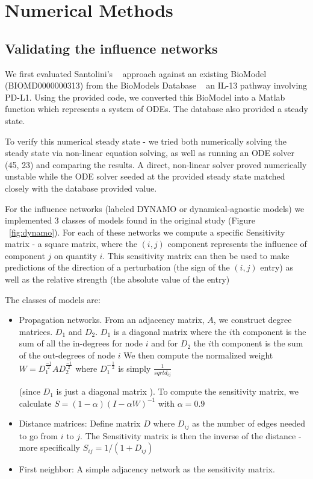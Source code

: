 \documentclass{article}
\begin{document}
\section{Numerical Methods} \label{Numerical_methods}
\subsection{Validating the influence networks}
We first evaluated Santolini's ~\cite{SantoliniE6375} approach against an existing BioModel  (BIOMD0000000313) from the BioModels Database  ~\cite{BioModels2010, PMID:21127196} an IL-13 pathway involving PD-L1. Using the provided code, we converted this BioModel into a Matlab function which represents a system of ODEs. The database also provided a steady state. 

To verify this numerical steady state - we tried both numerically solving the steady state via non-linear equation solving, as well as running an ODE solver (45, 23) and comparing the results. A direct, non-linear solver proved numerically unstable while the ODE solver seeded at the provided steady state matched closely with the database provided value. 

For the influence networks (labeled DYNAMO or dynamical-agnostic models) we implemented 3 classes of models found in the original study (Figure ~\ref{fig:dynamo}). For each of these networks we compute a specific Sensitivity matrix - a square matrix, where the $(i, j)$ component represents the influence of component $j$ on quantity $i$. This sensitivity matrix can then be used to make predictions of the direction of a perturbation (the sign of the $(i, j)$ entry) as well as the relative strength (the absolute value of the entry) ~\cite{SantoliniE6375}

The classes of models are: 
\begin{itemize}
    \item Propagation networks. From an adjacency matrix, $A$, we construct degree matrices. $D_1$ and $D_2$. $D_1$ is a diagonal matrix where the $i$th component is the sum of all the in-degrees for node $i$ and for $D_2$ the $i$th component is the sum of the out-degrees of node $i$
    We then compute the normalized weight $W = D_1^{\frac{-1}{2}}A D_2^{\frac{-1}{2}}$ where $D_1^{-\frac{1}{2}}$ is simply $\frac{1}{sqrt{d_{ij}}}$
    
    (since $D_1$ is just a diagonal matrix ). To compute the sensitivity matrix, we calculate $S = (1 - \alpha)(I - \alpha W)^{-1}$ with $\alpha = 0.9$
    
    \item Distance matrices: Define matrix $D$ where $D_{ij}$ as the number of edges needed to go from $i$ to $j$. The Sensitivity matrix is then the inverse of the distance - more specifically $S_{ij} = 1/(1 + D_{ij})$
    
    
    \item First neighbor: A simple adjacency network as the sensitivity matrix.
\end{itemize}
\end{document}
